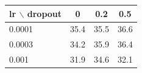 \begin{tabular}{l ccc}
\toprule
lr $\backslash$ dropout & 0 & 0.2 & 0.5 \\
\midrule
0.0001 & 35.4 & 35.5 & 36.6 \\
0.0003 & 34.2 & 35.9 & 36.4 \\
0.001 & 31.9 & 34.6 & 32.1 \\
\bottomrule
\end{tabular}
